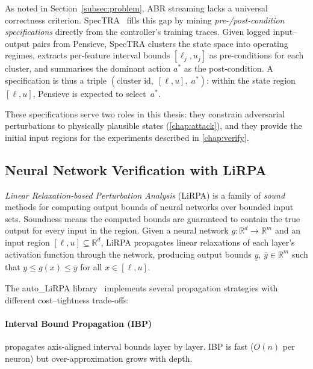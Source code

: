 \documentclass[thesis]{uofithesis} %
\begin{document}
    As noted in Section~\ref{subsec:problem}, ABR streaming lacks a
    universal correctness criterion.
    SpecTRA~\cite{spec-tra} fills this gap by mining
    \emph{pre-/post-condition specifications} directly from the controller's
    training traces.  Given logged input--output pairs from Pensieve,
    SpecTRA clusters the state space into operating regimes, extracts
    per-feature interval bounds $[\ell_j, u_j]$ as pre-conditions for each
    cluster, and summarises the dominant action $a^{\ast}$ as the
    post-condition.  A specification is thus a triple
    $(\text{cluster id},\; [\ell, u],\; a^{\ast})$: within the state
    region $[\ell, u]$, Pensieve is expected to select~$a^{\ast}$.
    
    These specifications serve two roles in this thesis: they constrain
    adversarial perturbations to physically plausible states
    (\ref{chap:attack}), and they provide the initial input
    regions for the experiments described in \ref{chap:verify}.
    
    
    \subsection{Neural Network Verification with LiRPA}
    \label{sec:bg-lirpa}
    
    \emph{Linear Relaxation-based Perturbation Analysis} (LiRPA) is a
    family of \emph{sound} methods for computing output bounds of
    neural networks over bounded input sets.  Soundness means the
    computed bounds are guaranteed to contain the true output for
    every input in the region.  Given a neural network
    $g : \mathbb{R}^d \to \mathbb{R}^m$ and an input region
    $[\ell, u] \subseteq \mathbb{R}^d$, LiRPA propagates linear
    relaxations of each layer's activation function through the
    network, producing output bounds
    $\underline{y},\, \overline{y} \in \mathbb{R}^m$ such that
    $\underline{y} \leq g(x) \leq \overline{y}$ for all $x \in [\ell, u]$.

    The auto\_LiRPA library~\cite{auto-lirpa} implements several
    propagation strategies with different cost--tightness trade-offs:

    \paragraph{Interval Bound Propagation (IBP)~\cite{ibp}}
    propagates axis-aligned interval bounds layer by layer.
    IBP is fast ($O(n)$ per neuron) but over-approximation grows with depth.
\end{document}
